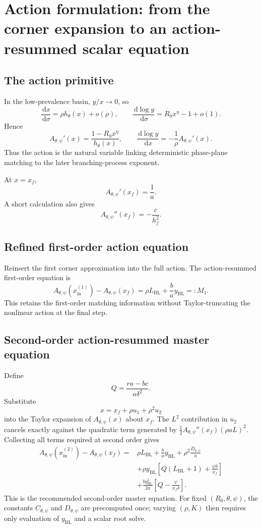 \documentclass[11pt]{article}
\newcommand{\Rzero}{R_0}
\newcommand{\hth}{h_\theta}
\newcommand{\Apsi}{A_{\theta,\psi}}
\newcommand{\Cpsi}{C_{\theta,\psi}}
\newcommand{\Dpsi}{D_{\theta,\psi}}
\newcommand{\xf}{x_f}
\newcommand{\yin}{y_{\mathrm{BL}}}
\newcommand{\xin}{x_{\mathrm{in}}}
\newcommand{\dd}{\,\mathrm{d}}
\begin{document}
\section{Action formulation: from the corner expansion to an action-resummed scalar equation}

\subsection{The action primitive}
In the low-prevalence basin, \(y/x\to0\), so
\[
\frac{\dd x}{\dd\sigma}=\rho\hth(x)+o(\rho),
\qquad
\frac{\dd\log y}{\dd\sigma}=\Rzero x^\eta-1+o(1).
\]
Hence
\[
\Apsi'(x)=\frac{1-\Rzero x^\eta}{\hth(x)},
\qquad
\frac{\dd\log y}{\dd x}
=-\frac1\rho\Apsi'(x).
\]
Thus the action is the natural variable linking deterministic phase-plane matching to the later branching-process exponent.

At \(x=\xf\),
\[
\Apsi'(\xf)=\frac1a.
\]
A short calculation also gives
\[
\Apsi''(\xf)=-\frac{c}{h_f^2}.
\]

\subsection{Refined first-order action equation}
Reinsert the first corner approximation into the full action. The action-resummed first-order equation is
\[
\Apsi\!\left(\xin^{(1)}\right)-\Apsi(\xf)
=\rho L_{\mathrm{BL}}+\frac ba\yin
=:M_1.
\]
This retains the first-order matching information without Taylor-truncating the nonlinear action at the final step.

\subsection{Second-order action-resummed master equation}
Define
\[
Q=\frac{ra-bc}{a\delta^2}.
\]
Substitute
\[
x=\xf+\rho u_1+\rho^2u_2
\]
into the Taylor expansion of \(\Apsi(x)\) about \(\xf\). The \(L^2\) contribution in \(u_2\) cancels exactly against the quadratic term generated by \(\frac12\Apsi''(\xf)(\rho aL)^2\). Collecting all terms required at second order gives
\[
\begin{aligned}
\Apsi\!\left(\xin^{(2)}\right)-\Apsi(\xf)
={}&\rho L_{\mathrm{BL}}+\frac ba\yin+\rho^2\frac{\Dpsi}{a}\\
&+\rho\yin\left[Q(L_{\mathrm{BL}}+1)+\frac{\psi b}{\xf}\right]\\
&+\frac{b\yin^2}{2a}
\left[Q-\frac{\psi}{\xf\delta}\right].
\end{aligned}
\]
This is the recommended second-order master equation. For fixed \((\Rzero,\theta,\psi)\), the constants \(\Cpsi\) and \(\Dpsi\) are precomputed once; varying \((\rho,K)\) then requires only evaluation of \(\yin\) and a scalar root solve.
\end{document}

